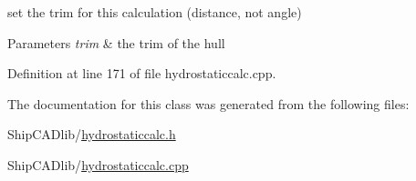 set the trim for this calculation (distance, not angle) 


\begin{DoxyParams}{Parameters}
{\em trim} & the trim of the hull \\
\hline
\end{DoxyParams}


Definition at line 171 of file hydrostaticcalc.\+cpp.



The documentation for this class was generated from the following files\+:\begin{DoxyCompactItemize}
\item 
Ship\+C\+A\+Dlib/\hyperlink{hydrostaticcalc_8h}{hydrostaticcalc.\+h}\item 
Ship\+C\+A\+Dlib/\hyperlink{hydrostaticcalc_8cpp}{hydrostaticcalc.\+cpp}\end{DoxyCompactItemize}
